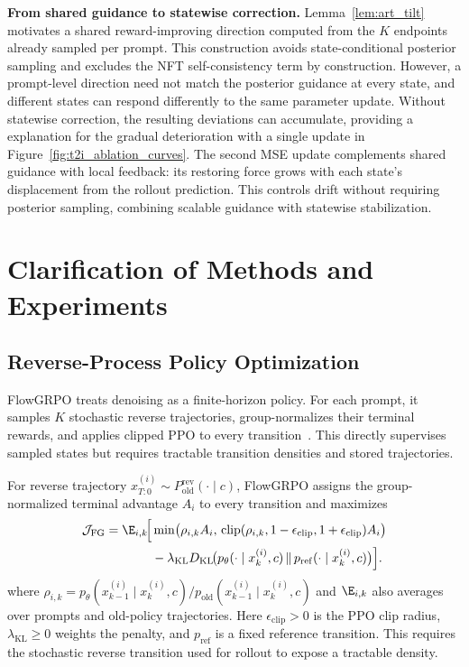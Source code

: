 \documentclass{article}
\begin{document}
\medskip
\noindent\textbf{From shared guidance to statewise correction.}
\label{app:art_guidance_approximation}
Lemma~\ref{lem:art_tilt} motivates a shared reward-improving direction computed from the $K$ endpoints already sampled per prompt.
This construction avoids state-conditional posterior sampling and excludes the NFT self-consistency term by construction.
However, a prompt-level direction need not match the posterior guidance at every state, and different states can respond differently to the same parameter update.
Without statewise correction, the resulting deviations can accumulate, providing a explanation for the gradual deterioration with a single update in Figure~\ref{fig:t2i_ablation_curves}.
The second MSE update complements shared guidance with local feedback: its restoring force grows with each state's displacement from the rollout prediction.
This controls drift without requiring posterior sampling, combining scalable guidance with statewise stabilization.


\section{Clarification of Methods and Experiments}
\label{app:clarifications}

\subsection{Reverse-Process Policy Optimization}
\label{app:flowgrpo_objective}

FlowGRPO treats denoising as a finite-horizon policy. For each prompt, it samples
$K$ stochastic reverse trajectories, group-normalizes their terminal rewards,
and applies clipped PPO to every transition~\citep{liu2025flowgrpo}. This
directly supervises sampled states but requires tractable transition densities
and stored trajectories.

For reverse trajectory
$x_{T:0}^{(i)}\sim P_{\mathrm{old}}^{\mathrm{rev}}(\cdot\mid c)$,
FlowGRPO assigns the group-normalized
terminal advantage $A_i$ to every transition and maximizes
\begin{equation}
\begin{aligned}
\mathcal J_{\mathrm{FG}}
=\E_{i,k}\!\Big[&
\min\!\big(\rho_{i,k}A_i,\,
\operatorname{clip}(\rho_{i,k},1-\epsilon_{\mathrm{clip}},
1+\epsilon_{\mathrm{clip}})A_i\big)\\
&-\lambda_{\mathrm{KL}}D_{\mathrm{KL}}\!\big(
p_\theta(\cdot\mid x_k^{(i)},c)\,\|\,
p_{\mathrm{ref}}(\cdot\mid x_k^{(i)},c)\big)\Big].
\end{aligned}
\end{equation}
where $\rho_{i,k}=p_\theta(x_{k-1}^{(i)}\mid x_k^{(i)},c)/
p_{\mathrm{old}}(x_{k-1}^{(i)}\mid x_k^{(i)},c)$ and
$\E_{i,k}$ also averages over prompts and old-policy trajectories.
Here $\epsilon_{\mathrm{clip}}>0$ is the PPO clip radius,
$\lambda_{\mathrm{KL}}\geq0$ weights the penalty, and $p_{\mathrm{ref}}$ is a
fixed reference transition. This requires the stochastic
reverse transition used for rollout to expose a tractable density.
\end{document}
